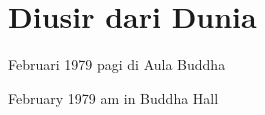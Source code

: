 \chapter{Diusir dari Dunia} %

 Februari 1979 pagi di Aula Buddha

 February 1979 am in Buddha Hall
